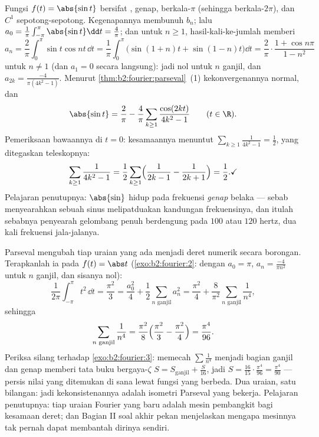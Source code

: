 \begin{example}\label{ex:b2:fourier:abssin}
Fungsi $f(t) = \abs{\sin t}$ bersifat , genap,
berkala-$\pi$ (sehingga berkala-$2\pi$), dan $C^1$ sepotong-sepotong.
Kegenapannya membunuh $b_n$; lalu $a_0 = \frac1\pi\int_{-\pi}^{\pi}
\abs{\sin t}\dd t = \frac4\pi$; dan untuk $n \geq 1$,
hasil-kali-ke-jumlah memberi
\[
a_n = \frac2\pi\int_0^\pi \sin t\cos nt\,\dd t
= \frac{1}{\pi}\int_0^\pi\bigl(\sin(1+n)t +
\sin(1-n)t\bigr)\dd t
= \frac2\pi\cdot\frac{1 + \cos n\pi}{1 - n^2}
\]
untuk $n \neq 1$ (dan $a_1 = 0$ secara langsung): jadi nol untuk $n$ ganjil, dan
$a_{2k} = \frac{-4}{\pi(4k^2-1)}$. Menurut
\cref{thm:b2:fourier:parseval}~(1) kekonvergenannya normal,
dan
\[
\abs{\sin t} = \frac{2}{\pi} - \frac{4}{\pi}
\sum_{k\geq1}\frac{\cos(2kt)}{4k^2 - 1}
\qquad (t \in \R) .
\]
Pemeriksaan bawaannya di $t = 0$: kesamaannya menuntut
$\sum_{k\geq1}\frac{1}{4k^2-1} = \frac12$, yang ditegaskan
teleskopnya:
\[
\sum_{k\geq1}\frac{1}{4k^2-1}
= \frac12\sum_{k\geq1}\Bigl(\frac{1}{2k-1} -
\frac{1}{2k+1}\Bigr) = \frac12 . \checkmark
\]
Pelajaran penutupnya:  $\abs{\sin}$ hidup pada
frekuensi \emph{genap} belaka --- sebab menyearahkan sebuah sinus melipatduakan
kandungan frekuensinya, dan itulah sebabnya penyearah gelombang penuh berdengung pada
$100$ atau $120$ hertz, dua kali frekuensi jala-jalanya.
\end{example}

\begin{example}\label{ex:b2:fourier:zetafourodd}
Parseval mengubah tiap uraian yang ada menjadi deret numerik secara borongan.
Terapkanlah ia pada $f(t) = \abs t$ (\cref{exo:b2:fourier:2}: dengan $a_0 =
\pi$, $a_n = \frac{-4}{\pi n^2}$ untuk $n$ ganjil, dan sisanya nol):
\[
\frac{1}{2\pi}\int_{-\pi}^{\pi}t^2\,\dd t = \frac{\pi^2}{3}
= \frac{a_0^2}{4} + \frac12\sum_{n \text{ ganjil}} a_n^2
= \frac{\pi^2}{4} +
\frac{8}{\pi^2}\sum_{n\text{ ganjil}}\frac{1}{n^4} ,
\]
sehingga
\[
\sum_{n\text{ ganjil}}\frac{1}{n^4}
= \frac{\pi^2}{8}\Bigl(\frac{\pi^2}{3} -
\frac{\pi^2}{4}\Bigr) = \frac{\pi^4}{96} .
\]
Periksa silang terhadap \cref{exo:b2:fourier:3}: memecah
$\sum\frac1{n^4}$ menjadi bagian ganjil dan genap memberi tata buku
bergaya-$\zeta$ $S = S_{\mathrm{ganjil}} + \frac{S}{16}$, jadi $S =
\frac{16}{15}\cdot\frac{\pi^4}{96} = \frac{\pi^4}{90}$ ---
persis nilai yang ditemukan di sana lewat fungsi yang berbeda. Dua
uraian, satu bilangan: jadi kekonsistenannya adalah isometri Parseval
yang bekerja. Pelajaran penutupnya: tiap uraian Fourier yang baru adalah
mesin pembangkit bagi kesamaan deret; dan Bagian II soal akhir
pekan menjelaskan mengapa mesinnya tak pernah dapat
membantah dirinya sendiri.
\end{example}

